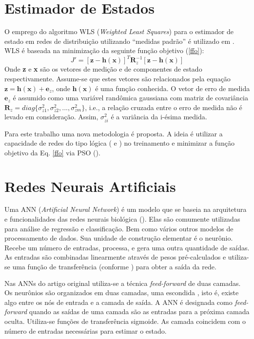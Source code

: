 \documentclass{IEEEtran}
\begin{document}
\section{Estimador de Estados}
O emprego do algoritmo WLS (\textit{Weighted Least Squares}) para o estimador de estado em redes de distribuição utilizando ``medidas padrão'' é utilizado em \cite{singh2009choice}. WLS é baseada na minimização da seguinte função objetivo (\ref{ffo}):
\begin{equation} \label{ffo}
J'=[\textbf{z}-\textbf{h}(\textbf{x})]^T\textbf{R}_z^{-1}[\textbf{z}-\textbf{h}(\textbf{x})]  
\end{equation}
Onde \textbf{z} e \textbf{x} são os vetores de medição e de componentes de estado respectivamente. Assume-se que estes vetores são relacionados pela equação $\textbf{z}=\textbf{h}(\textbf{x})+\textbf{e}_z$, onde $\textbf{h}(\textbf{x})$ é uma função conhecida. O vetor de erro de medida $\textbf{e}_z$ é assumido como uma variável randômica gaussiana com matriz de covariância $\textbf{R}_z=diag\{\sigma^2_{z1},\sigma^2_{z2}, ...,\sigma^2_{zm}\}$, i.e., a relação cruzada entre o erro de medida \cite{caro2009power} não é levado em consideração. Assim, $\sigma^2_{zi}$ é a variância da i-ésima medida.

Para este trabalho uma nova metodologia é proposta. A ideia é utilizar a capacidade de redes do tipo lógica (\cite{pedrycz2006or} e \cite{eu2014RNALogica}) no treinamento e minimizar a função objetivo da Eq. \ref{ffo} via PSO (\cite{del2008particle}).


\section{Redes Neurais Artificiais} \label{rna}
Uma ANN (\textit{Artificial Neural Network}) é um modelo que se baseia na arquitetura e funcionalidades das redes neurais biológica (\cite{manitsas2012distribution}). Elas são comumente utilizadas para análise de regressão e classificação. Bem como vários outros modelos de processamento de dados. Sua unidade de construção elementar é o neurônio. Recebe um número de entradas, processa, e gera uma outra quantidade de saídas. As entradas são combinadas linearmente através de pesos pré-calculados e utiliza-se uma função de transferência (conforme \cite{hippert2001neural}) para obter a saída da rede.

Nas ANNs do artigo original utiliza-se a técnica \textit{feed-forward} de duas camadas. 
Os neurônios são organizados em duas camadas, uma escondida , isto é, existe algo entre os nós de entrada e a camada de saída. A ANN é designada como \textit{feed-forward} quando as saídas de uma camada são as entradas para a próxima camada oculta. Utiliza-se funções de transferência sigmoide. As camada coincidem com o número de entradas necessárias para estimar o estado.
\end{document}
